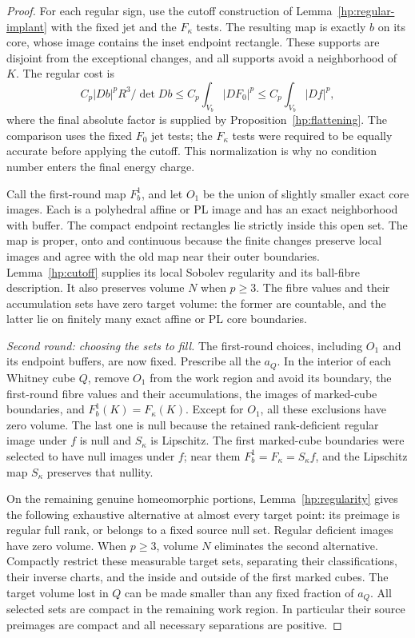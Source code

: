 \begin{proof}
For each regular sign, use the cutoff construction of
Lemma~\ref{hp:regular-implant} with the fixed jet and the
$F_\kappa$ tests.  The resulting map is exactly $b$
on its core, whose image contains the inset endpoint rectangle.
These supports are disjoint from the exceptional changes, and all
supports avoid a neighborhood of $K$.  The regular cost is
\[
 C_p |Db|^pR^3/\det Db
       \leq C_p\int_{V_b}|DF_0|^p
       \leq C_p\int_{V_b}|Df|^p,
\]
where the final absolute factor is supplied by
Proposition~\ref{hp:flattening}.  The comparison uses the fixed
$F_0$ jet tests; the $F_\kappa$ tests were required to be equally
accurate before applying the cutoff.  This normalization is why no
condition number enters the final energy charge.

Call the first-round map $F_b^1$, and let $O_1$ be the union of
slightly smaller exact core images.  Each is a polyhedral affine or
PL image and has an exact neighborhood with buffer.  The compact
endpoint rectangles lie strictly inside this open set.  The map is
proper, onto and continuous because the finite changes preserve
local images and agree with the old map near their outer boundaries.
Lemma~\ref{hp:cutoff} supplies its local Sobolev regularity and its
ball-fibre description.  It also preserves volume $N$ when $p\geq3$.
The fibre values and their accumulation sets have zero target
volume: the former are countable, and the latter lie on finitely
many exact affine or PL core boundaries.

\emph{Second round: choosing the sets to fill.}
The first-round choices, including $O_1$ and its endpoint buffers,
are now fixed.  Prescribe all the $a_Q$.  In the interior of each
Whitney cube $Q$, remove $O_1$ from the work region and avoid its
boundary, the first-round fibre values and their accumulations, the
images of marked-cube boundaries, and $F_b^1(K)=F_\kappa(K)$.
Except for $O_1$, all these exclusions have zero volume.  The last
one is null because the retained rank-deficient regular image under
$f$ is null and $S_\kappa$ is Lipschitz.  The first marked-cube boundaries were selected to have null images
under $f$; near them $F_b^1=F_\kappa=S_\kappa f$, and the
Lipschitz map $S_\kappa$ preserves that nullity.

On the remaining genuine homeomorphic portions,
Lemma~\ref{hp:regularity} gives the following exhaustive alternative
at almost every target point: its preimage is regular full rank, or
belongs to a fixed source null set.  Regular deficient images have
zero volume.  When $p\geq3$, volume $N$ eliminates the second
alternative.  Compactly restrict these measurable target sets,
separating their classifications, their inverse charts, and the
inside and outside of the first marked cubes.  The target volume
lost in $Q$ can be made smaller than any fixed fraction of $a_Q$.
All selected sets are compact in the remaining work region.  In
particular their source preimages are compact and all necessary
separations are positive.


\end{proof}
